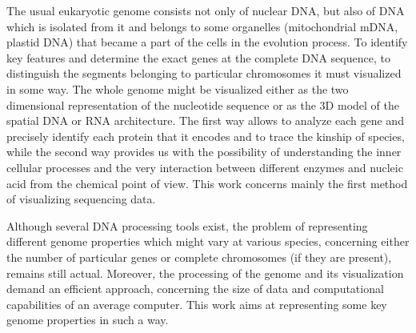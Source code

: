 The usual eukaryotic genome consists not only of nuclear DNA, but also of DNA which is isolated from it and belongs to some organelles (mitochondrial mDNA, plastid DNA) that became a part of the cells in the evolution process. To identify key features and determine the exact genes at the complete DNA sequence, to distinguish the segments belonging to particular chromosomes it must visualized in some way. The whole genome might be visualized either as the two dimensional representation of the nucleotide sequence or as the 3D model of the spatial DNA or RNA architecture. The first way allows to analyze each gene and precisely identify each protein that it encodes and to trace the kinship of species, while the second way provides us with the possibility of understanding the inner cellular processes and the very interaction between different enzymes and nucleic acid from the chemical point of view. This work concerns mainly the first method of visualizing sequencing data. 

Although several DNA processing tools exist, the problem of representing different genome properties which might vary at various species, concerning either the number of particular genes or complete chromosomes (if they are present), remains still actual. Moreover, the processing of the genome and its visualization demand an efficient approach, concerning the size of data and computational capabilities of an average computer. This work aims at representing some key genome properties in such a way.
